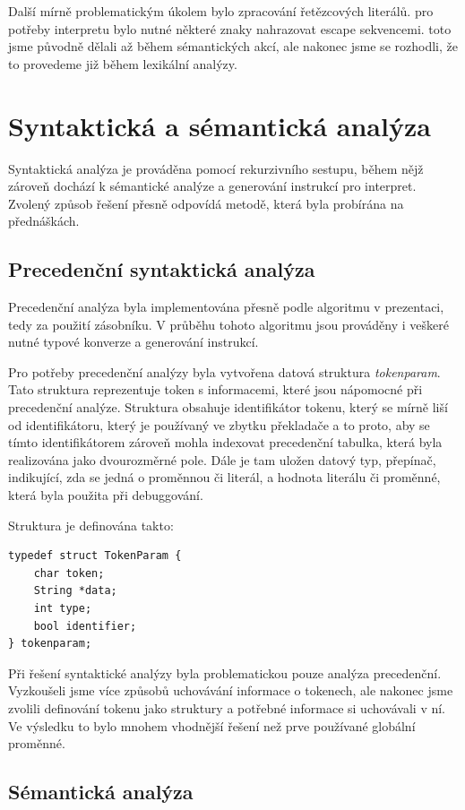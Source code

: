 \documentclass[11pt, a4paper]{article}
\begin{document}
Další mírně problematickým úkolem bylo zpracování řetězcových literálů. pro potřeby interpretu bylo nutné některé znaky nahrazovat escape sekvencemi. toto jsme původně dělali až během sémantických akcí, ale nakonec jsme se rozhodli, že to provedeme již během lexikální analýzy.

\section{Syntaktická a sémantická analýza}
Syntaktická analýza je prováděna pomocí rekurzivního sestupu, během nějž zároveň dochází k sémantické analýze a generování instrukcí pro interpret. 
Zvolený způsob řešení přesně odpovídá metodě, která byla probírána na přednáškách.

\subsection{Precedenční syntaktická analýza}
Precedenční analýza byla implementována přesně podle algoritmu v prezentaci, tedy za použití zásobníku. V průběhu tohoto algoritmu jsou prováděny i veškeré nutné typové konverze a generování instrukcí.

Pro potřeby precedenční analýzy byla vytvořena datová struktura \textit{tokenparam}.
Tato struktura reprezentuje token s informacemi, které jsou nápomocné při precedenční analýze. 
Struktura obsahuje identifikátor tokenu, který se mírně liší od identifikátoru, který je používaný ve zbytku překladače a to proto, aby se tímto identifikátorem zároveň mohla indexovat precedenční tabulka, která byla realizována jako dvourozměrné pole. 
Dále je tam uložen datový typ, přepínač, indikující, zda se jedná o proměnnou či literál, a hodnota literálu či proměnné, která byla použita při debuggování.

Struktura je definována takto:
\begin{verbatim}
typedef struct TokenParam {
    char token;
    String *data;
    int type;
    bool identifier;
} tokenparam;
\end{verbatim}

Při řešení syntaktické analýzy byla problematickou pouze analýza precedenční. Vyzkoušeli jsme více způsobů uchovávání informace o tokenech, ale nakonec jsme zvolili definování tokenu jako struktury a potřebné informace si uchovávali v ní. Ve výsledku to bylo mnohem vhodnější řešení než prve používané globální proměnné.

\subsection{Sémantická analýza}
\end{document}
